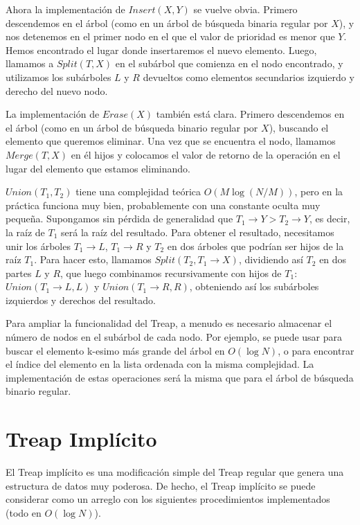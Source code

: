 \documentclass[12pt]{article}
\newcommand{\nl}{\vspace{0.3cm}}
\begin{document}
Ahora la implementación de $Insert(X, Y)$ se vuelve obvia. Primero descendemos en el árbol (como en un árbol de búsqueda binaria regular por $X$), y nos detenemos en el primer nodo en el que el valor de prioridad es menor que $Y$. Hemos encontrado el lugar donde insertaremos el nuevo elemento. Luego, llamamos a $Split(T, X)$ en el subárbol que comienza en el nodo encontrado, y utilizamos los subárboles $L$ y $R$ devueltos como elementos secundarios izquierdo y derecho del nuevo nodo.

\nl

La implementación de $Erase(X)$ también está clara. Primero descendemos en el árbol (como en un árbol de búsqueda binario regular por $X$), buscando el elemento que queremos eliminar. Una vez que se encuentra el nodo, llamamos $Merge(T, X)$ en él hijos y colocamos el valor de retorno de la operación en el lugar del elemento que estamos eliminando.

\nl

$Union(T_1, T_2)$ tiene una complejidad teórica $O(M \log (N / M))$, pero en la práctica funciona muy bien, probablemente con una constante oculta muy pequeña. Supongamos sin pérdida de generalidad que $T_1 \rightarrow Y > T_2 \rightarrow Y$, es decir, la raíz de $T_1$ será la raíz del resultado. Para obtener el resultado, necesitamos unir los árboles $T_1 \rightarrow L$, $T_1 \rightarrow R$ y $T_2$ en dos árboles que podrían ser hijos de la raíz $T_1$. Para hacer esto, llamamos $Split(T_2, T_1 \rightarrow X)$, dividiendo así $T_2$ en dos partes $L$ y $R$, que luego combinamos recursivamente con hijos de $T_1$: $Union(T_1 \rightarrow L, L)$ y $Union(T_1 \rightarrow R, R)$, obteniendo así los subárboles izquierdos y derechos del resultado.

\nl

Para ampliar la funcionalidad del Treap, a menudo es necesario almacenar el número de nodos en el subárbol de cada nodo. Por ejemplo, se puede usar para buscar el elemento k-esimo más grande del árbol en $O(\log N)$, o para encontrar el índice del elemento en la lista ordenada con la misma complejidad. La implementación de estas operaciones será la misma que para el árbol de búsqueda binario regular.

\section{Treap Implícito}

El Treap implícito es una modificación simple del Treap regular que genera una estructura de datos muy poderosa. De hecho, el Treap implícito se puede considerar como un arreglo con los siguientes procedimientos implementados (todo en $O(\log N)$).
\end{document}
